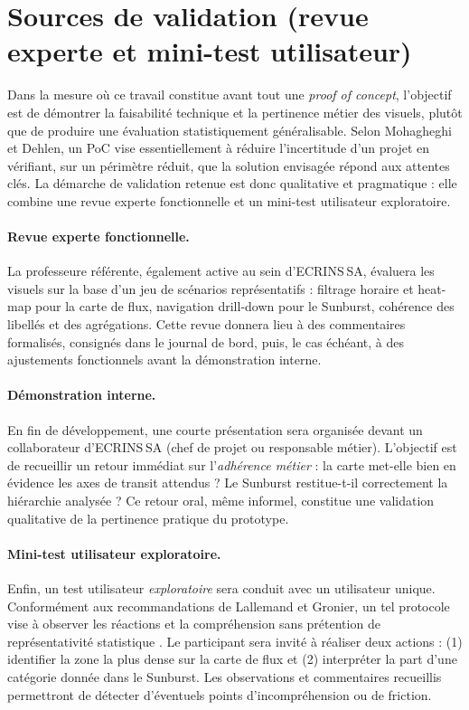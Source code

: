 \section{Sources de validation (revue experte et mini-test utilisateur)}
\label{sec:validation-sources}

Dans la mesure où ce travail constitue avant tout une \textit{proof of
concept}, l’objectif est de démontrer la faisabilité technique et la pertinence
métier des visuels, plutôt que de produire une évaluation statistiquement
généralisable. Selon Mohagheghi et Dehlen, un PoC vise essentiellement à
réduire l’incertitude d’un projet en vérifiant, sur un périmètre réduit, que
la solution envisagée répond aux attentes clés\parencite{MohagheghiPoC2008}.
La démarche de validation retenue est donc qualitative et pragmatique : elle
combine une revue experte fonctionnelle et un mini-test utilisateur
exploratoire.

\paragraph{Revue experte fonctionnelle.}
La professeure référente, également active au sein d’ECRINS SA, évaluera les
visuels sur la base d’un jeu de scénarios représentatifs : filtrage
horaire et heat-map pour la carte de flux, navigation drill-down pour le
Sunburst, cohérence des libellés et des agrégations. Cette revue donnera lieu
à des commentaires formalisés, consignés dans le journal de bord, puis, le cas
échéant, à des ajustements fonctionnels avant la démonstration interne.

\paragraph{Démonstration interne.}
En fin de développement, une courte présentation sera organisée devant un
collaborateur d’ECRINS SA (chef de projet ou responsable métier). L’objectif
est de recueillir un retour immédiat sur l’\emph{adhérence métier} :
la carte met-elle bien en évidence les axes de transit attendus ?
Le Sunburst restitue-t-il correctement la hiérarchie analysée ?  
Ce retour oral, même informel, constitue une validation qualitative de la
pertinence pratique du prototype.

\paragraph{Mini-test utilisateur exploratoire.}
Enfin, un test utilisateur \emph{exploratoire} sera conduit avec un
utilisateur unique. Conformément aux recommandations de Lallemand et
Gronier, un tel protocole vise à observer les réactions et la
compréhension sans prétention de représentativité statistique
\parencite{LallemandUX2016}. Le participant sera invité à réaliser deux
actions : (1) identifier la zone la plus dense sur la carte de flux et
(2) interpréter la part d’une catégorie donnée dans le Sunburst. Les
observations et commentaires recueillis permettront de détecter d’éventuels
points d’incompréhension ou de friction.

